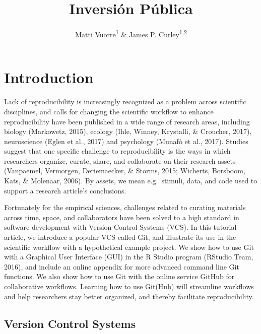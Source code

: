 \documentclass[
  american,
  ,doc,floatsintext]{apa6}
\title{Inversión Pública}
\author{Matti Vuorre\textsuperscript{1} \& James P. Curley\textsuperscript{1,2}}
\date{}
\affiliation{\vspace{0.5cm}\textsuperscript{1} Department of Psychology, Columbia University, New York, USA\\\textsuperscript{2} Department of Psychology, University of Texas at Austin, Texas, USA}
\begin{document}
\maketitle

\newpage

\hypertarget{introduction}{%
\section{Introduction}\label{introduction}}

Lack of reproducibility is increasingly recognized as a problem across scientific disciplines, and calls for changing the scientific workflow to enhance reproducibility have been published in a wide range of research areas, including biology (Markowetz, 2015), ecology (Ihle, Winney, Krystalli, \& Croucher, 2017), neuroscience (Eglen et al., 2017) and psychology (Munafò et al., 2017). Studies suggest that one specific challenge to reproducibility is the ways in which researchers organize, curate, share, and collaborate on their research assets (Vanpaemel, Vermorgen, Deriemaecker, \& Storms, 2015; Wicherts, Borsboom, Kats, \& Molenaar, 2006). By assets, we mean e.g.~stimuli, data, and code used to support a research article's conclusions.

Fortunately for the empirical sciences, challenges related to curating materials across time, space, and collaborators have been solved to a high standard in software development with Version Control Systems (VCS). In this tutorial article, we introduce a popular VCS called Git, and illustrate its use in the scientific workflow with a hypothetical example project. We show how to use Git with a Graphical User Interface (GUI) in the R Studio program (RStudio Team, 2016), and include an online appendix for more advanced command line Git functions. We also show how to use Git with the online service GitHub for collaborative workflows. Learning how to use Git(Hub) will streamline workflows and help researchers stay better organized, and thereby facilitate reproducibility.

\hypertarget{version-control-systems}{%
\subsection{Version Control Systems}\label{version-control-systems}}
\end{document}

